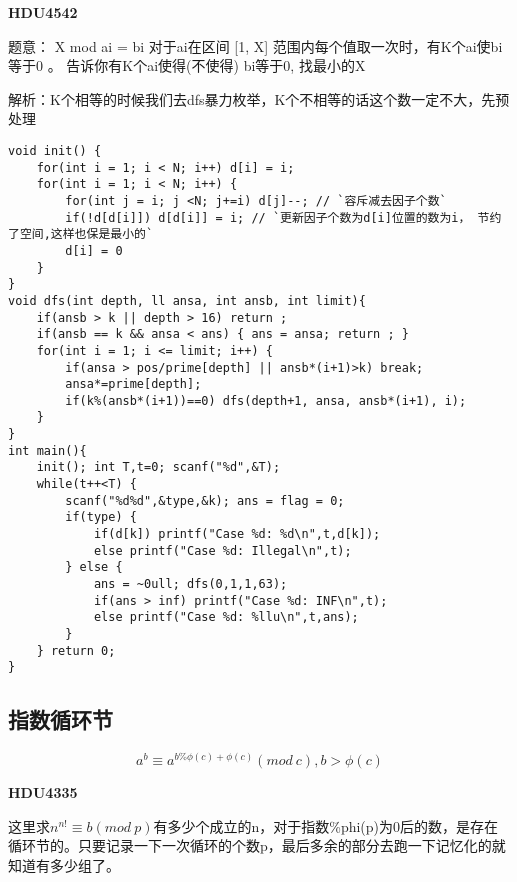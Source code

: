 {\bfseries HDU4542}

题意： X mod ai = bi  对于ai在区间 [1, X] 范围内每个值取一次时，有K个ai使bi等于0 。 告诉你有K个ai使得(不使得) bi等于0, 找最小的X

解析：K个相等的时候我们去dfs暴力枚举，K个不相等的话这个数一定不大，先预处理

\begin{lstlisting}
void init() {
    for(int i = 1; i < N; i++) d[i] = i; 
    for(int i = 1; i < N; i++) {
        for(int j = i; j <N; j+=i) d[j]--; // `容斥减去因子个数`
        if(!d[d[i]]) d[d[i]] = i; // `更新因子个数为d[i]位置的数为i， 节约了空间,这样也保是最小的`
        d[i] = 0
    }
}
void dfs(int depth, ll ansa, int ansb, int limit){
    if(ansb > k || depth > 16) return ;
    if(ansb == k && ansa < ans) { ans = ansa; return ; } 
    for(int i = 1; i <= limit; i++) {
        if(ansa > pos/prime[depth] || ansb*(i+1)>k) break;
        ansa*=prime[depth];
        if(k%(ansb*(i+1))==0) dfs(depth+1, ansa, ansb*(i+1), i);
    }
}
int main(){
    init(); int T,t=0; scanf("%d",&T);
    while(t++<T) {
        scanf("%d%d",&type,&k); ans = flag = 0;
        if(type) {
            if(d[k]) printf("Case %d: %d\n",t,d[k]);
            else printf("Case %d: Illegal\n",t);
        } else {
            ans = ~0ull; dfs(0,1,1,63);
            if(ans > inf) printf("Case %d: INF\n",t);
            else printf("Case %d: %llu\n",t,ans);
        }
    } return 0;
}

\end{lstlisting}

\subsection{指数循环节}

$$a^b \equiv a^{b \% \phi(c)+\phi(c)}(mod \ c),b>\phi(c) $$

{\bfseries HDU4335}

这里求$n^{n!} \equiv b(mod \ p)$有多少个成立的n，对于指数\%phi(p)为0后的数，是存在循环节的。只要记录一下一次循环的个数p，最后多余的部分去跑一下记忆化的就知道有多少组了。


